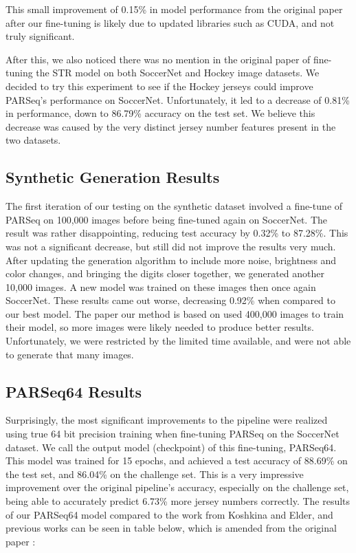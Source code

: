 \documentclass[11pt, letterpaper]{article}
\begin{document}
This small improvement of 0.15\% in model performance from the original paper after our fine-tuning is likely due to updated libraries such as CUDA, and not truly significant.

After this, we also noticed there was no mention in the original paper of fine-tuning the STR model on both SoccerNet and Hockey image datasets. We decided to try this experiment to see if the Hockey jerseys could improve PARSeq's performance on SoccerNet. Unfortunately, it led to a decrease of 0.81\% in performance, down to 86.79\% accuracy on the test set. We believe this decrease was caused by the very distinct jersey number features present in the two datasets.

\subsection{Synthetic Generation Results}

The first iteration of our testing on the synthetic dataset involved a fine-tune of PARSeq on 100,000 images before being fine-tuned again on SoccerNet. The result was rather disappointing, reducing test accuracy by 0.32\% to 87.28\%. This was not a significant decrease, but still did not improve the results very much. After updating the generation algorithm to include more noise, brightness and color changes, and bringing the digits closer together, we generated another 10,000 images. A new model was trained on these images then once again SoccerNet. These results came out worse, decreasing 0.92\% when compared to our best model. The paper our method is based on used 400,000 images to train their model, so more images were likely needed to produce better results. Unfortunately, we were restricted by the limited time available, and were not able to generate that many images.

\subsection{PARSeq64 Results}

Surprisingly, the most significant improvements to the pipeline were realized using true 64 bit precision training when fine-tuning PARSeq on the SoccerNet dataset. We call the output model (checkpoint) of this fine-tuning, PARSeq64. This model was trained for 15 epochs, and achieved a test accuracy of 88.69\% on the test set, and 86.04\% on the challenge set. This is a very impressive improvement over the original pipeline's accuracy, especially on the challenge set, being able to accurately predict 6.73\% more jersey numbers correctly. The results of our PARSeq64 model compared to the work from Koshkina and Elder, and previous works can be seen in table below, which is amended from the original paper \cite{main_paper}:
\end{document}

